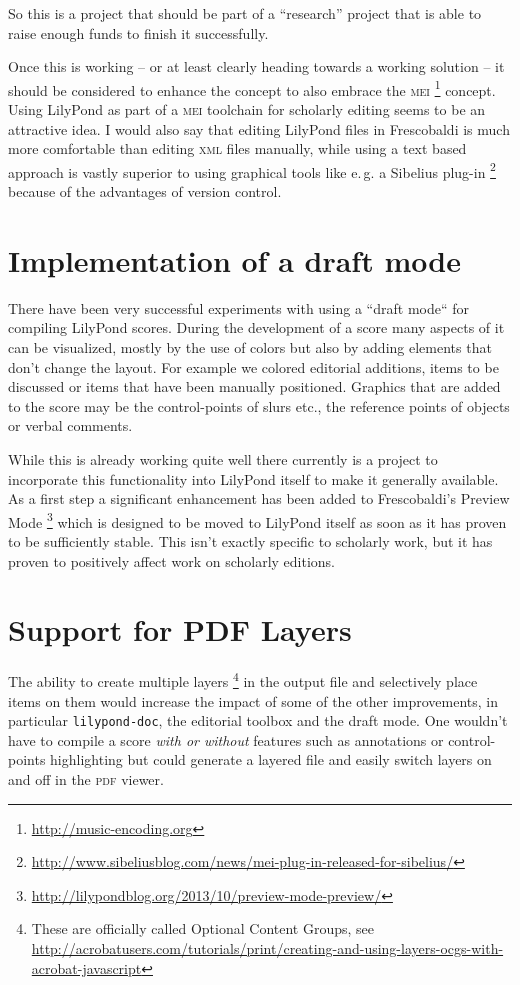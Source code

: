\documentclass[oneside]{OLLbook}
\begin{document}
So this is a project that should be part of a “research” project that is able to raise enough funds to finish it successfully.

Once this is working -- or at least clearly heading towards a working solution -- it should be considered to enhance the concept to also embrace the \textsc{mei}%
\footnote{\url{http://music-encoding.org}}
concept.
Using LilyPond as part of a \textsc{mei} toolchain for scholarly editing seems to be an attractive idea.
I would also say that editing LilyPond files in Frescobaldi is much more comfortable than editing \textsc{xml} files manually, while using a text based approach is vastly superior to using graphical tools like e.\,g. a Sibelius plug-in%
\footnote{\url{http://www.sibeliusblog.com/news/mei-plug-in-released-for-sibelius/}}
because of the advantages of version control.


\section{Implementation of a draft mode}\label{sec:implementation-of-a-draft-mode}
There have been very successful experiments with using a “draft mode“ for compiling LilyPond scores.
During the development of a score many aspects of it can be visualized, mostly by the use of colors but also by adding elements that don't change the layout.
For example we colored editorial additions, items to be discussed or items that have been manually positioned.
Graphics that are added to the score may be the control-points of slurs etc., the reference points of objects or verbal comments.

While this is already working quite well there currently is a project to incorporate this functionality into LilyPond itself to make it generally available.
As a first step a significant enhancement has been added to Frescobaldi's Preview Mode%
\footnote{\url{http://lilypondblog.org/2013/10/preview-mode-preview/}}
which is designed to be moved to LilyPond itself as soon as it has proven to be sufficiently stable.
This isn't exactly specific to scholarly work, but it has proven to positively affect work on scholarly editions.

\section{Support for PDF Layers}\label{sec:support-for-pdf-layers}
The ability to create multiple layers%
\footnote{These are officially called Optional Content Groups, see\\ \url{http://acrobatusers.com/tutorials/print/creating-and-using-layers-ocgs-with-acrobat-javascript}}
in the output file and selectively place items on them would increase the impact of some of the other improvements, in particular \texttt{lilypond-doc}, the editorial toolbox and the draft mode.
One wouldn't have to compile a score \emph{with or without} features such as annotations or control-points highlighting but could generate a layered file and easily switch layers on and off in the \textsc{pdf} viewer.
\end{document}
